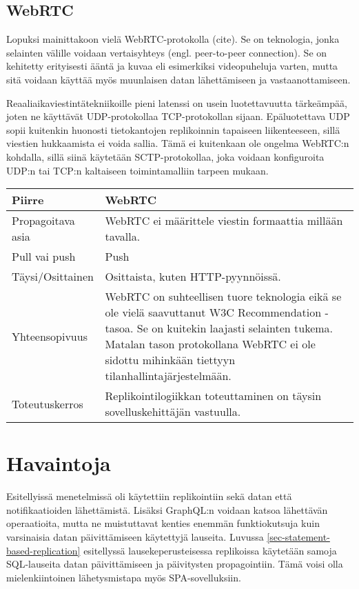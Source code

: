 \documentclass[finnish,twoside,censored,csm,sw-track-2018]{HYthesisML}
\begin{document}
\subsection{WebRTC}

Lopuksi mainittakoon vielä WebRTC-protokolla (cite). Se on teknologia, jonka selainten välille voidaan vertaisyhteys (engl. peer-to-peer connection). Se on kehitetty erityisesti ääntä ja kuvaa eli esimerkiksi videopuheluja varten, mutta sitä voidaan käyttää myös muunlaisen datan lähettämiseen ja vastaanottamiseen.

Reaaliaikaviestintätekniikoille pieni latenssi on usein luotettavuutta tärkeämpää, joten ne käyttävät UDP-protokollaa TCP-protokollan sijaan. Epäluotettava UDP sopii kuitenkin huonosti tietokantojen replikoinnin tapaiseen liikenteeseen, sillä viestien hukkaamista ei voida sallia. Tämä ei kuitenkaan ole ongelma WebRTC:n kohdalla, sillä siinä käytetään SCTP-protokollaa, joka voidaan konfiguroita UDP:n tai TCP:n kaltaiseen toimintamalliin tarpeen mukaan.

\begin{center}
\begin{tabular}{ | m{3.3cm} | m{11.7cm} | }
 \hline
 \textbf{Piirre} & \textbf{WebRTC}\\ 
 \hline
 Propagoitava asia & WebRTC ei määrittele viestin formaattia millään tavalla. \\
 \hline
 Pull vai push & Push\\
 \hline
 Täysi/Osittainen & Osittaista, kuten HTTP-pyynnöissä. \\
 \hline
 Yhteensopivuus & WebRTC on suhteellisen tuore teknologia eikä se ole vielä saavuttanut W3C Recommendation -tasoa. Se on kuitekin laajasti selainten tukema. Matalan tason protokollana WebRTC ei ole sidottu mihinkään tiettyyn tilanhallintajärjestelmään.\\
 \hline
 Toteutuskerros & Replikointilogiikkan toteuttaminen on täysin sovelluskehittäjän vastuulla. \\
 \hline
\end{tabular}
\end{center}

\section{Havaintoja}

Esitellyissä menetelmissä oli käytettiin replikointiin sekä datan että notifikaatioiden lähet\-tämistä. Lisäksi GraphQL:n voidaan katsoa lähettävän operaatioita, mutta ne muistuttavat kenties enemmän funktiokutsuja kuin varsinaisia datan päivittämiseen käytettyjä lauseita. Luvussa \ref{sec-statement-based-replication} esitellyssä lausekeperusteisessa replikoissa käytetään samoja SQL-lauseita datan päivittämiseen ja päivitysten propagointiin. Tämä voisi olla mielenkiintoinen lähetysmistapa myös SPA-sovelluksiin.
\end{document}
